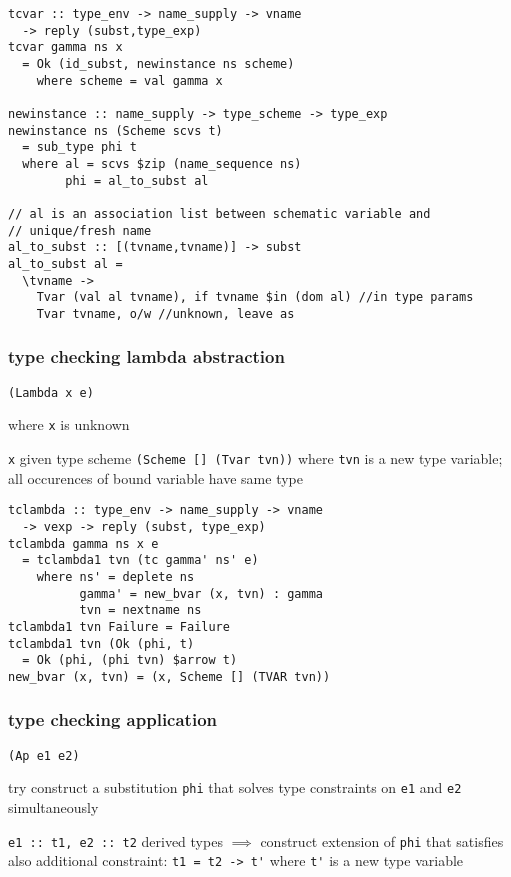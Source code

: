 \documentclass[8pt]{extarticle}
\begin{document}
\begin{multicols*}{2}
\begin{verbatim}
tcvar :: type_env -> name_supply -> vname
  -> reply (subst,type_exp)
tcvar gamma ns x
  = Ok (id_subst, newinstance ns scheme)
    where scheme = val gamma x

newinstance :: name_supply -> type_scheme -> type_exp
newinstance ns (Scheme scvs t)
  = sub_type phi t
  where al = scvs $zip (name_sequence ns)
        phi = al_to_subst al

// al is an association list between schematic variable and
// unique/fresh name
al_to_subst :: [(tvname,tvname)] -> subst
al_to_subst al =
  \tvname ->
    Tvar (val al tvname), if tvname $in (dom al) //in type params
    Tvar tvname, o/w //unknown, leave as
\end{verbatim}

\subsubsection{type checking lambda abstraction}

\verb|(Lambda x e)|

where \verb|x| is unknown

\verb|x| given type scheme \verb|(Scheme [] (Tvar tvn))| where \verb|tvn| is a new type variable; all occurences of bound variable have same type

\begin{verbatim}
tclambda :: type_env -> name_supply -> vname
  -> vexp -> reply (subst, type_exp)
tclambda gamma ns x e
  = tclambda1 tvn (tc gamma' ns' e)
    where ns' = deplete ns
          gamma' = new_bvar (x, tvn) : gamma
          tvn = nextname ns
tclambda1 tvn Failure = Failure
tclambda1 tvn (Ok (phi, t)
  = Ok (phi, (phi tvn) $arrow t)
new_bvar (x, tvn) = (x, Scheme [] (TVAR tvn))
\end{verbatim}

\vfill\null
\columnbreak

\subsubsection{type checking application}

\verb|(Ap e1 e2)|

try construct a substitution \verb|phi| that solves type constraints on \verb|e1| and \verb|e2| simultaneously

\verb|e1 :: t1, e2 :: t2| derived types $\implies$ construct extension of \verb|phi| that satisfies also additional constraint: \verb|t1 = t2 -> t'| where \verb|t'| is a new type variable


\end{multicols*}
\end{document}
